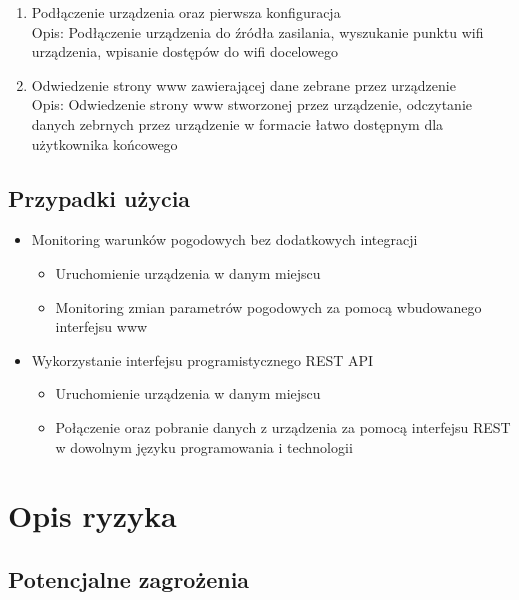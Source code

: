 \documentclass[12pt,a4paper]{article}
\begin{document}
\begin{enumerate}
    \item Podłączenie urządzenia oraz pierwsza konfiguracja\\
    Opis: Podłączenie urządzenia do źródła zasilania, wyszukanie punktu wifi urządzenia, wpisanie dostępów do wifi docelowego
    \item Odwiedzenie strony www zawierającej dane zebrane przez urządzenie\\
    Opis: Odwiedzenie strony www stworzonej przez urządzenie, odczytanie danych zebrnych przez urządzenie w formacie łatwo dostępnym dla
    użytkownika końcowego
\end{enumerate}

\subsection{Przypadki użycia}

\begin{itemize}
    \item Monitoring warunków pogodowych bez dodatkowych integracji
    \begin{itemize}
        \item Uruchomienie urządzenia w danym miejscu
        \item Monitoring zmian parametrów pogodowych za pomocą wbudowanego interfejsu www
    \end{itemize}
    \item Wykorzystanie interfejsu programistycznego REST API
    \begin{itemize}
        \item Uruchomienie urządzenia w danym miejscu
        \item Połączenie oraz pobranie danych z urządzenia za pomocą interfejsu REST w dowolnym języku programowania i technologii
    \end{itemize}
\end{itemize}

\section{Opis ryzyka}

\subsection{Potencjalne zagrożenia}
\end{document}
